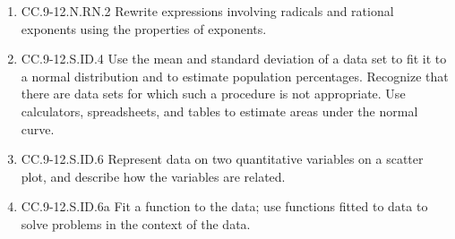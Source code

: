 \documentclass{article}
\begin{document}
\begin{enumerate}
	\item CC.9-12.N.RN.2  Rewrite expressions involving radicals and rational exponents using the properties of exponents.
	\item CC.9-12.S.ID.4  Use the mean and standard deviation of a data set to fit it to a normal distribution and to estimate population percentages. Recognize that there are data sets for which such a procedure is not appropriate. Use calculators, spreadsheets, and tables to estimate areas under the normal curve.
	\item CC.9-12.S.ID.6  Represent data on two quantitative variables on a scatter plot, and describe how the variables are related.
	\item CC.9-12.S.ID.6a Fit a function to the data; use functions fitted to data to solve problems in the context of the data. 
\end{enumerate}
\end{document}
